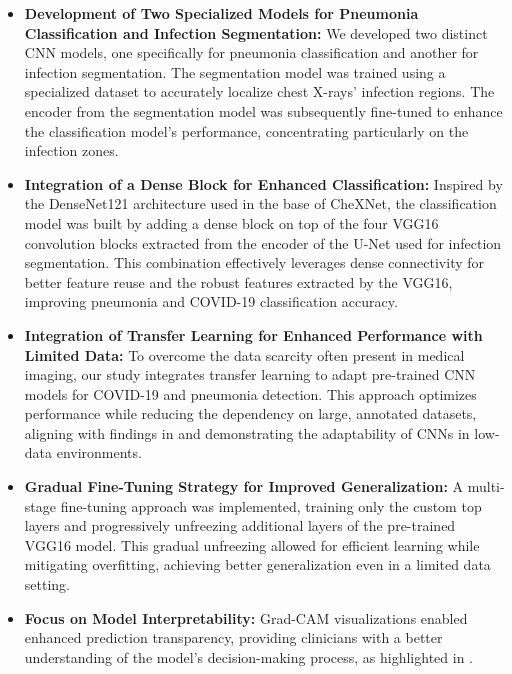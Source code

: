 \documentclass[10pt]{article}
\begin{document}
\begin{itemize}
    \item \textbf{Development of Two Specialized Models for Pneumonia Classification and Infection Segmentation:} We developed two distinct CNN models, one specifically for pneumonia classification and another for infection segmentation. The segmentation model was trained using a specialized dataset to accurately localize chest X-rays' infection regions. The encoder from the segmentation model was subsequently fine-tuned to enhance the classification model's performance, concentrating particularly on the infection zones.

    \item \textbf{Integration of a Dense Block for Enhanced Classification:} Inspired by the DenseNet121 architecture used in the base of CheXNet, the classification model was built by adding a dense block on top of the four VGG16 convolution blocks extracted from the encoder of the U-Net used for infection segmentation. This combination effectively leverages dense connectivity for better feature reuse and the robust features extracted by the VGG16, improving pneumonia and COVID-19 classification accuracy.

    \item \textbf{Integration of Transfer Learning for Enhanced Performance with Limited Data:} To overcome the data scarcity often present in medical imaging, our study integrates transfer learning to adapt pre-trained CNN models for COVID-19 and pneumonia detection. This approach optimizes performance while reducing the dependency on large, annotated datasets, aligning with findings in \cite{Salehi2023, Manickam2021} and demonstrating the adaptability of CNNs in low-data environments.

    \item \textbf{Gradual Fine-Tuning Strategy for Improved Generalization:} A multi-stage fine-tuning approach was implemented, training only the custom top layers and progressively unfreezing additional layers of the pre-trained VGG16 model. This gradual unfreezing allowed for efficient learning while mitigating overfitting, achieving better generalization even in a limited data setting.

    \item \textbf{Focus on Model Interpretability:} Grad-CAM visualizations enabled enhanced prediction transparency, providing clinicians with a better understanding of the model's decision-making process, as highlighted in \cite{Wang2019, Tong2018}.

\end{itemize}
\end{document}
